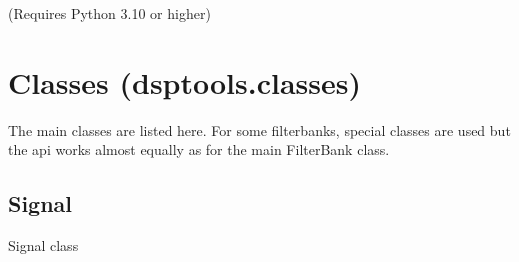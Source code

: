 \documentclass[letterpaper,10pt,english]{sphinxmanual}
\begin{document}
\sphinxAtStartPar
(Requires Python 3.10 or higher)

\sphinxstepscope


\chapter{Classes (dsptools.classes)}
\label{\detokenize{classes:classes-dsptools-classes}}\label{\detokenize{classes::doc}}
\sphinxAtStartPar
The main classes are listed here. For some filterbanks, special classes are used but the api works almost equally
as for the main FilterBank class.


\section{Signal}
\label{\detokenize{classes:module-dsptools.classes.signal_class}}\label{\detokenize{classes:signal}}
\sphinxAtStartPar
Signal class
\end{document}
